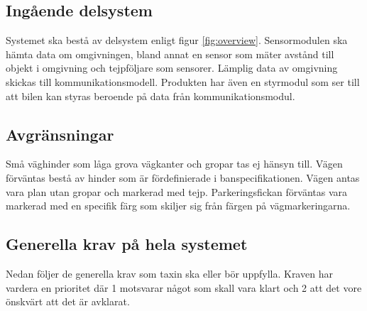 \documentclass[kravspec/krav.tex]{subfiles}
\begin{document}
\subsection{Ingående delsystem}
Systemet ska bestå av delsystem enligt figur \ref{fig:overview}. Sensormodulen
ska hämta data om omgivningen, bland annat en sensor som mäter avstånd till
objekt i omgivning och tejpföljare som sensorer. Lämplig data av omgivning
skickas till kommunikationsmodell. Produkten har även en styrmodul som ser till
att bilen kan styras beroende på data från kommunikationsmodul.

\subsection{Avgränsningar}
Små väghinder som låga grova vägkanter och gropar tas ej hänsyn till. Vägen
förväntas bestå av hinder som är fördefinierade i banspecifikationen. Vägen
antas vara plan utan gropar och markerad med tejp. Parkeringsfickan förväntas
vara markerad med en specifik färg som skiljer sig från färgen på
vägmarkeringarna.

\subsection{Generella krav på hela systemet}
Nedan följer de generella krav som taxin ska eller bör uppfylla.  Kraven har
vardera en prioritet där 1 motsvarar något som skall vara klart och 2 att det
vore önskvärt att det är avklarat.
\end{document}
